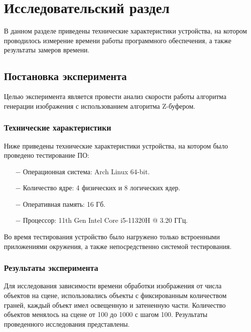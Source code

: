 \section{Исследовательский раздел}

В данном разделе приведены технические характеристики устройства, на котором проводилось измерение времени работы программного обеспечения, а также результаты замеров времени.

\subsection{Постановка эксперимента}

Целью эксперимента является провести анализ скорости работы алгоритма генерации изображения с использованием алгоритма Z-буфером.

\subsubsection{Технические характеристики}


Ниже приведены технические характеристики устройства, на котором было проведено тестирование ПО:

\begin{itemize}
    \item[$-$] Операционная система: Arch Linux \cite{arch} 64-bit.
	  \item[$-$] Количество ядре: 4 физических и 8 логических ядер.
    \item[$-$] Оперативная память: 16 Гб.
    \item[$-$] Процессор: 11th Gen Intel\textsuperscript{\tiny\textregistered} Core\textsuperscript{\tiny\texttrademark} i5-11320H @ 3.20 ГГц\cite{i5}.
\end{itemize}

 Во время тестирования устройство было нагружено только встроенными приложениями окружения, а также непосредственно системой тестирования.

\subsubsection{Результаты эксперимента}

Для исследования зависимости времени обработки изображения от числа объектов на сцене, использовались объекты с фиксированным количеством граней, каждый объект имел освещенную и затененную части. Количество объектов менялось на сцене от 100 до 1000 с шагом 100. Результаты проведенного исследования представлены.


